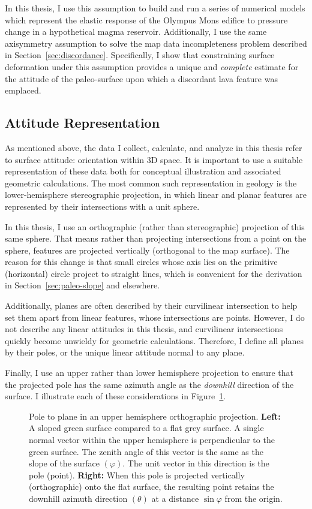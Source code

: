 In this thesis, I use this assumption to build and run a series of numerical models which represent the elastic response of the Olympus Mons edifice to pressure change in a hypothetical magma reservoir. Additionally, I use the same axisymmetry assumption to solve the map data incompleteness problem described in Section~\ref{sec:discordance}. Specifically, I show that constraining surface deformation under this assumption provides a unique and \emph{complete} estimate for the attitude of the paleo-surface upon which a discordant lava feature was emplaced.

\subsection{Attitude Representation}

As mentioned above, the data I collect, calculate, and analyze in this thesis refer to surface attitude: orientation within 3D space. It is important to use a suitable representation of these data both for conceptual illustration and associated geometric calculations. The most common such representation in geology is the lower-hemisphere stereographic projection, in which linear and planar features are represented by their intersections with a unit sphere.

In this thesis, I use an orthographic (rather than stereographic) projection of this same sphere. That means rather than projecting intersections from a point on the sphere, features are projected vertically (orthogonal to the map surface). The reason for this change is that small circles whose axis lies on the primitive (horizontal) circle project to straight lines, which is convenient for the derivation in Section~\ref{sec:paleo-slope} and elsewhere.

Additionally, planes are often described by their curvilinear intersection to help set them apart from linear features, whose intersections are points. However, I do not describe any linear attitudes in this thesis, and curvilinear intersections quickly become unwieldy for geometric calculations. Therefore, I define all planes by their poles, or the unique linear attitude normal to any plane.

Finally, I use an upper rather than lower hemisphere projection to ensure that the projected pole has the same azimuth angle as the \emph{downhill} direction of the surface. I illustrate each of these considerations in Figure~\ref{fig:surface}.

\begin{figure}
    \caption[Orthographic pole to plane]{Pole to plane in an upper hemisphere orthographic projection. \textbf{Left:} A sloped green surface compared to a flat grey surface. A single normal vector within the upper hemisphere is perpendicular to the green surface. The zenith angle of this vector is the same as the slope of the surface $(\varphi)$. The unit vector in this direction is the pole (point). \textbf{Right:} When this pole is projected vertically (orthographic) onto the flat surface, the resulting point retains the downhill azimuth direction $(\theta)$ at a distance $\sin\varphi$ from the origin.}%
    \label{fig:surface}%
\end{figure}


